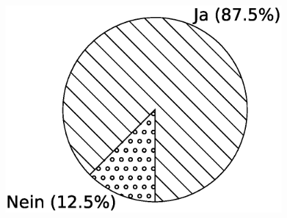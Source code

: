 \hfill
\begin{minipage}{0.45\textwidth}
  \centering
  \includegraphics[width=0.8\textwidth]{img/pi_goker_mix.eps}
  \label{Chap:Eval-Sec:Goker-Fig:Mix}
\end{minipage}

